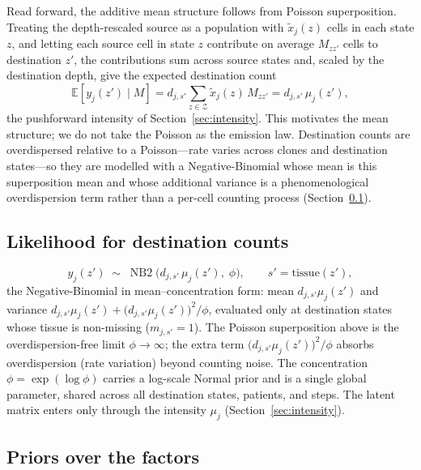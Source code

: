 \documentclass[11pt]{article}
\newcommand{\Zsp}{\mathcal{Z}}                    %
\newcommand{\E}{\mathbb{E}}
\theoremstyle{definition}
\begin{document}
Read forward, the additive mean structure follows from Poisson superposition.
Treating the depth-rescaled source as a population with $\tilde{x}_j(z)$ cells in
each state $z$, and letting each source cell in state $z$ contribute on average
$M_{zz'}$ cells to destination $z'$, the contributions sum across source states
and, scaled by the destination depth, give the expected destination count
\[
  \E\!\left[ y_j(z') \mid M \right]
  =
  d_{j,s'} \sum_{z\in\Zsp} \tilde{x}_j(z)\, M_{zz'}
  =
  d_{j,s'}\, \mu_j(z') ,
\]
the pushforward intensity of Section~\ref{sec:intensity}. This motivates the mean
structure; we do not take the Poisson as the emission law. Destination counts are
overdispersed relative to a Poisson---rate varies across clones and destination
states---so they are modelled with a Negative-Binomial whose mean is this
superposition mean and whose additional variance is a phenomenological
overdispersion term rather than a per-cell counting process
(Section~\ref{sec:likelihood}).

\subsection{Likelihood for destination counts}
\label{sec:likelihood}

\begin{keybox}[title={Observation likelihood}]
\[
  y_j(z') \;\sim\; \operatorname{NB2}\!\bigl( d_{j,s'}\, \mu_j(z'),\; \phi \bigr),
  \qquad s' = \mathrm{tissue}(z'),
\]
the Negative-Binomial in mean--concentration form: mean $d_{j,s'}\mu_j(z')$ and
variance $d_{j,s'}\mu_j(z') + \bigl(d_{j,s'}\mu_j(z')\bigr)^2 / \phi$, evaluated only
at destination states whose tissue is non-missing ($m_{j,s'} = 1$). The Poisson
superposition above is the overdispersion-free limit $\phi\to\infty$; the extra
term $\bigl(d_{j,s'}\mu_j(z')\bigr)^2/\phi$ absorbs overdispersion (rate variation)
beyond counting noise. The concentration $\phi=\exp(\log\phi)$ carries a log-scale
Normal prior and is a single global parameter, shared across all destination
states, patients, and steps. The latent matrix enters only through the intensity
$\mu_j$ (Section~\ref{sec:intensity}).
\end{keybox}

\subsection{Priors over the factors}
\label{sec:priors}
\end{document}
